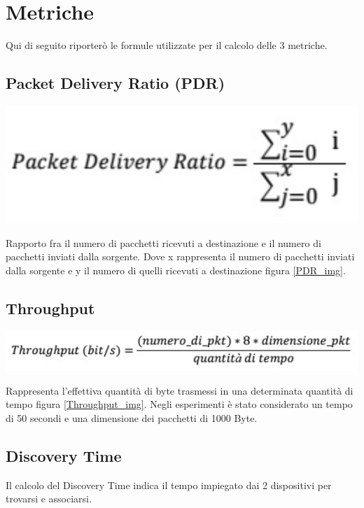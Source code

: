 \section{Metriche}
Qui di seguito riporterò le formule utilizzate per il calcolo delle 3 metriche.

\subsection{Packet Delivery Ratio (PDR)}
\begin{center}
\includegraphics[width=1\textwidth]{imgs/PDR.jpg}
\label{PDR_img}%
\end{center}

Rapporto fra il numero di pacchetti ricevuti a destinazione e il numero di pacchetti inviati dalla sorgente.
Dove x rappresenta il numero di pacchetti inviati dalla sorgente e y il numero di quelli ricevuti a destinazione figura \ref{PDR_img}. 

\subsection{Throughput}
\begin{center}
\includegraphics[width=1\textwidth]{imgs/Throughput.jpg}
\label{Throughput_img}%
\end{center}

Rappresenta l’effettiva quantità di byte trasmessi in una determinata quantità di tempo figura \ref{Throughput_img}.
Negli esperimenti è stato considerato un tempo di 50 secondi e una dimensione dei pacchetti di 1000 Byte.

\subsection{Discovery Time}

Il calcolo del Discovery Time indica il tempo impiegato dai 2 dispositivi per trovarsi e associarsi.





\clearpage{\pagestyle{empty}\cleardoublepage}